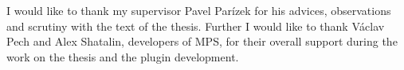 \openright

\noindent

I would like to thank my supervisor Pavel Parízek for his advices, observations
and scrutiny with the text of the thesis.
Further I would like to thank Václav Pech and Alex Shatalin, developers of MPS, for their overall support during the work on the thesis and the plugin development.

